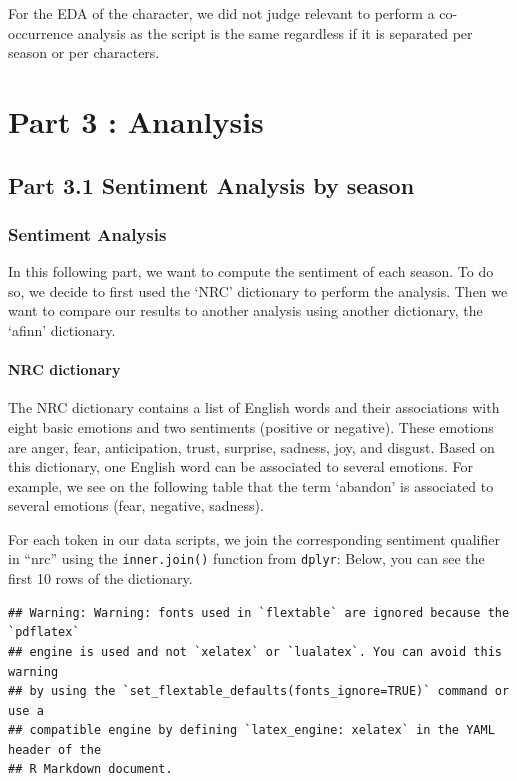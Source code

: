 \documentclass[
]{article}
\begin{document}
For the EDA of the character, we did not judge relevant to perform a
co-occurrence analysis as the script is the same regardless if it is
separated per season or per characters.

\hypertarget{part-3-ananlysis}{%
\section{Part 3 : Ananlysis}\label{part-3-ananlysis}}

\hypertarget{part-3.1-sentiment-analysis-by-season}{%
\subsection{Part 3.1 Sentiment Analysis by
season}\label{part-3.1-sentiment-analysis-by-season}}

\hypertarget{sentiment-analysis}{%
\subsubsection{Sentiment Analysis}\label{sentiment-analysis}}

In this following part, we want to compute the sentiment of each season.
To do so, we decide to first used the `NRC' dictionary to perform the
analysis. Then we want to compare our results to another analysis using
another dictionary, the `afinn' dictionary.

\hypertarget{nrc-dictionary}{%
\paragraph{NRC dictionary}\label{nrc-dictionary}}

The NRC dictionary contains a list of English words and their
associations with eight basic emotions and two sentiments (positive or
negative). These emotions are anger, fear, anticipation, trust,
surprise, sadness, joy, and disgust. Based on this dictionary, one
English word can be associated to several emotions. For example, we see
on the following table that the term `abandon' is associated to several
emotions (fear, negative, sadness).

For each token in our data scripts, we join the corresponding sentiment
qualifier in ``nrc'' using the \texttt{inner.join()} function from
\texttt{dplyr}: Below, you can see the first 10 rows of the dictionary.

\begin{verbatim}
## Warning: Warning: fonts used in `flextable` are ignored because the `pdflatex`
## engine is used and not `xelatex` or `lualatex`. You can avoid this warning
## by using the `set_flextable_defaults(fonts_ignore=TRUE)` command or use a
## compatible engine by defining `latex_engine: xelatex` in the YAML header of the
## R Markdown document.
\end{verbatim}
\end{document}
